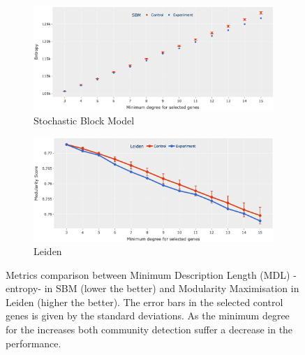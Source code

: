 \begin{figure}[!h]
    \centering
    \begin{subfigure}[!t]{1.0\textwidth}
        \includegraphics[width=\textwidth]{Sections/Network_I/Resources/selective_pruning/com_comp/sbm_ent_sel_prun.png}
        \caption{Stochastic Block Model}
        \label{fig:N_I:sbm_com_det_met}
    \end{subfigure}\hspace{\fill} 
    \begin{subfigure}[!t]{1.0\textwidth}
        \includegraphics[width=\linewidth]{Sections/Network_I/Resources/selective_pruning/com_comp/leid_mod_sel_prun.png}
        \caption{Leiden}
        \label{fig:N_I:leid_com_det_met}
    \end{subfigure}
    \caption[Metrics comparison between Leiden and SBM]{Metrics comparison between Minimum Description Length (MDL) - entropy- in SBM (lower the better) and Modularity Maximisation in Leiden (higher the better). The error bars in the selected control genes is given by the standard deviations. As the minimum degree for the increases both community detection suffer a decrease in the performance. }
    \label{fig:N_I:com_det_met}
\end{figure}


